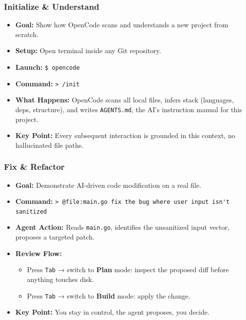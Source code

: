 \begin{frame}[fragile]\frametitle{Initialize \& Understand}
  \begin{itemize}
    \item \textbf{Goal:} Show how OpenCode scans and understands a new project from scratch.
    \item \textbf{Setup:} Open terminal inside any Git repository.
    \item \textbf{Launch:} \lstinline|$ opencode|
    \item \textbf{Command:} \lstinline|> /init|
    \item \textbf{What Happens:} OpenCode scans all local files, infers stack (languages, deps, structure), and writes \texttt{AGENTS.md},  the AI's instruction manual for this project.
    \item \textbf{Key Point:} Every subsequent interaction is grounded in this context,  no hallucinated file paths.
  \end{itemize}
\end{frame}

\begin{frame}[fragile]\frametitle{Fix \& Refactor}
  \begin{itemize}
    \item \textbf{Goal:} Demonstrate AI-driven code modification on a real file.
    \item \textbf{Command:} \lstinline|> @file:main.go fix the bug where user input isn't sanitized|
    \item \textbf{Agent Action:} Reads \texttt{main.go}, identifies the unsanitized input vector, proposes a targeted patch.
    \item \textbf{Review Flow:}
      \begin{itemize}
        \item Press \texttt{Tab} → switch to \textbf{Plan} mode: inspect the proposed diff before anything touches disk.
        \item Press \texttt{Tab} → switch to \textbf{Build} mode: apply the change.
      \end{itemize}
    \item \textbf{Key Point:} You stay in control,  the agent proposes, you decide.
  \end{itemize}
\end{frame}

